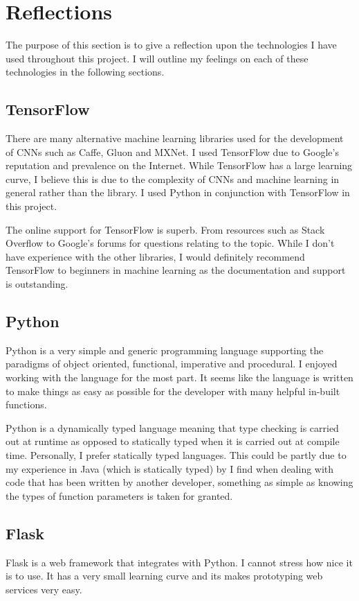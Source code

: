 \section{Reflections}
The purpose of this section is to give a reflection upon the technologies I have used throughout this project.
I will outline my feelings on each of these technologies in the following sections.

\tocless\subsection{TensorFlow}
There are many alternative machine learning libraries used for the development of CNNs such as Caffe, Gluon and MXNet.
I used TensorFlow due to Google's reputation and prevalence on the Internet.
While TensorFlow has a large learning curve, I believe this is due to the complexity of CNNs and machine learning in general rather than the library.
I used Python in conjunction with TensorFlow in this project.

The online support for TensorFlow is superb.
From resources such as Stack Overflow to Google's forums for questions relating to the topic.
While I don't have experience with the other libraries, I would definitely recommend TensorFlow to beginners in machine learning as the documentation and support is outstanding.

\tocless\subsection{Python}
Python is a very simple and generic programming language supporting the paradigms of object oriented, functional, imperative and procedural.
I enjoyed working with the language for the most part.
It seems like the language is written to make things as easy as possible for the developer with many helpful in-built functions.

Python is a dynamically typed language meaning that type checking is carried out at runtime as opposed to statically typed when it is carried out at compile time.
Personally, I prefer statically typed languages.
This could be partly due to my experience in Java (which is statically typed) by I find when dealing with code that has been written by another developer, something as simple as knowing the types of function parameters is taken for granted.

\tocless\subsection{Flask}
Flask is a web framework that integrates with Python.
I cannot stress how nice it is to use.
It has a very small learning curve and its makes prototyping web services very easy.

